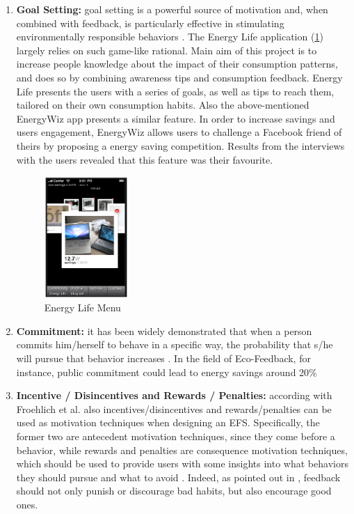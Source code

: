 \begin{enumerate}
\begin{itemize}
\end{itemize}

\item \textbf{Goal Setting:}
goal setting is a powerful source of motivation and, when combined with feedback, is particularly effective in stimulating environmentally responsible behaviors \cite{Froehlich2010}. The Energy Life application \cite{Giulio2009}(\cref{fig:energylife}) largely relies on such game-like rational. Main aim of this project is to increase people knowledge about the impact of their consumption patterns, and does so by combining awareness tips and consumption feedback. Energy Life presents the users with a series of goals, as well as tips to reach them, tailored on their own consumption habits. Also the above-mentioned EnergyWiz app \cite{Petkov2011} presents a similar feature. In order to increase savings and users engagement, EnergyWiz allows users to challenge a Facebook friend of theirs by proposing a energy saving competition. Results from the interviews with the users revealed that this feature was their favourite. 

\begin{figure}[h]
\centering
\includegraphics[width=0.3\textwidth]{./Images/energylife}
\caption{Energy Life Menu}
\label{fig:energylife}
\end{figure}

\item \textbf{Commitment:}
it has been widely demonstrated that when a person commits him/herself to behave in a specific way, the probability that s/he will pursue that behavior increases \cite{Froehlich2010}. In the field of Eco-Feedback, for instance, public commitment could lead to energy savings around 20\% \cite{CommitmentandVoluntaryEnergyConservation}

\item \textbf{Incentive / Disincentives and Rewards / Penalties:}
according with Froehlich et al. \cite{Froehlich2010} also incentives/disincentives and rewards/penalties can be used as motivation techniques when designing an \ac{EFS}. Specifically, the former two are antecedent motivation techniques, since they come before a behavior, while rewards and penalties are consequence motivation techniques, which should be used to provide users with some insights into what behaviors they should pursue and what to avoid \cite{Froehlich2010}. Indeed, as pointed out in \cite{Giulio2009}, feedback should not only punish or discourage bad habits, but also encourage good ones.


\end{enumerate}
